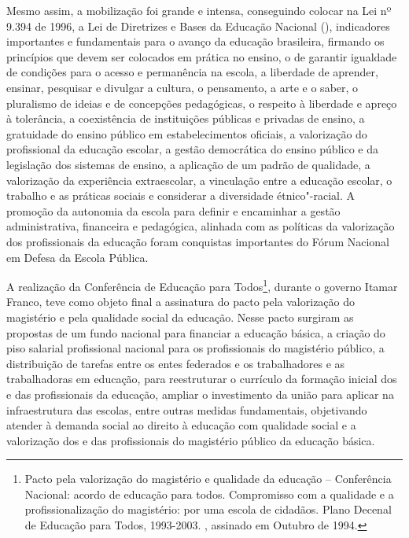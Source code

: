Mesmo assim, a mobilização foi grande e intensa, conseguindo colocar na
Lei nº 9.394 de 1996, a Lei de Diretrizes e Bases da Educação Nacional
(), indicadores importantes e fundamentais para o avanço da educação
brasileira, firmando os princípios que devem ser colocados em prática no
ensino, o de garantir igualdade de
condições para o acesso e permanência na escola,
a liberdade de aprender, ensinar,
pesquisar e divulgar a cultura, o pensamento, a arte e o saber,
o pluralismo de ideias e de concepções
pedagógicas, o respeito à liberdade e
apreço à tolerância, a coexistência de
instituições públicas e privadas de
ensino, a gratuidade do ensino público
em estabelecimentos oficiais, a
valorização do profissional da educação
escolar, a gestão democrática do
ensino público e da legislação dos sistemas de ensino,
a aplicação de um padrão de qualidade,
a valorização da experiência
extraescolar, a vinculação entre a
educação escolar, o trabalho e as práticas sociais
e considerar a diversidade
étnico"-racial. A promoção da autonomia da escola para definir e
encaminhar a gestão administrativa, financeira e pedagógica, alinhada
com as políticas da valorização dos profissionais da educação foram
conquistas importantes do Fórum Nacional em Defesa da Escola
Pública.

A realização da Conferência de Educação para Todos\footnote{Pacto pela
  valorização do magistério e qualidade da educação -- Conferência
  Nacional: acordo de educação para todos. Compromisso com a qualidade e
  a profissionalização do magistério: por uma escola de cidadãos. Plano
  Decenal de Educação para Todos, 1993-2003. , assinado em Outubro de
  1994.}, durante o governo Itamar Franco, teve como objeto final a
assinatura do pacto pela valorização do magistério e pela qualidade
social da educação. Nesse pacto surgiram as propostas de um fundo
nacional para financiar a educação básica, a criação do piso salarial
profissional nacional para os profissionais do magistério público, a
distribuição de tarefas entre os entes federados e os trabalhadores e as
trabalhadoras em educação, para reestruturar o currículo da formação
inicial dos e das profissionais da educação, ampliar o investimento da
união para aplicar na infraestrutura das escolas, entre outras medidas
fundamentais, objetivando atender à demanda social ao direito à educação
com qualidade social e a valorização dos e das profissionais do
magistério público da educação básica.

